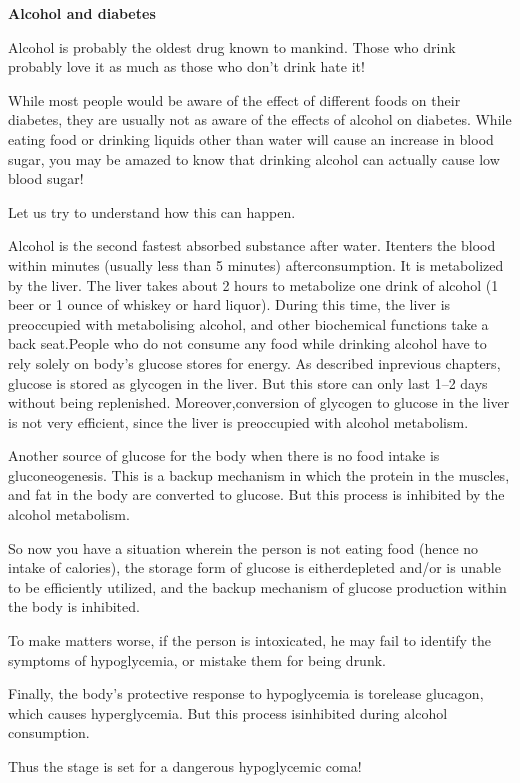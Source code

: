 \noindent\textbf{Alcohol and diabetes}

Alcohol is probably the oldest drug known to mankind. Those who drink probably love it as much as those who don’t drink hate it!

While most people would be aware of the effect of different foods on their diabetes, they are usually not as aware of the effects of alcohol on diabetes. While eating food or drinking liquids other than water will cause an increase in blood sugar, you may be amazed to know that drinking alcohol can actually cause low blood sugar!

Let us try to understand how this can happen.

Alcohol is the second fastest absorbed substance after water. It\break enters the blood within minutes (usually less than 5 minutes) after\break consumption. It is metabolized by the liver. The liver takes about 2 hours to metabolize one drink of alcohol (1 beer or 1 ounce of whiskey or hard liquor). During this time, the liver is preoccupied with metabo\-lising alcohol, and other biochemical functions take a back seat.\break People who do not consume any food while drinking alcohol have to rely solely on body’s glucose stores for energy. As described in\break previous chapters, glucose is stored as glycogen in the liver. But this store can only last 1–2 days without being replenished. Moreover,\break conversion of glycogen to glucose in the liver is not very efficient, since the liver is preoccupied with alcohol metabolism.

Another source of glucose for the body when there is no food intake is gluconeogenesis. This is a backup mechanism in which the protein in the muscles, and fat in the body are converted to glucose. But this process is inhibited by the alcohol metabolism.

So now you have a situation wherein the person is not eating food (hence no intake of calories), the storage form of glucose is either\break depleted and/or is unable to be efficiently utilized, and the backup mechanism of glucose production within the body is inhibited.

To make matters worse, if the person is intoxicated, he may fail to identify the symptoms of hypoglycemia, or mistake them for being drunk.

Finally, the body’s protective response to hypoglycemia is to\break release glucagon, which causes hyperglycemia. But this process is\break inhibited during alcohol consumption.

Thus the stage is set for a dangerous hypoglycemic coma!

